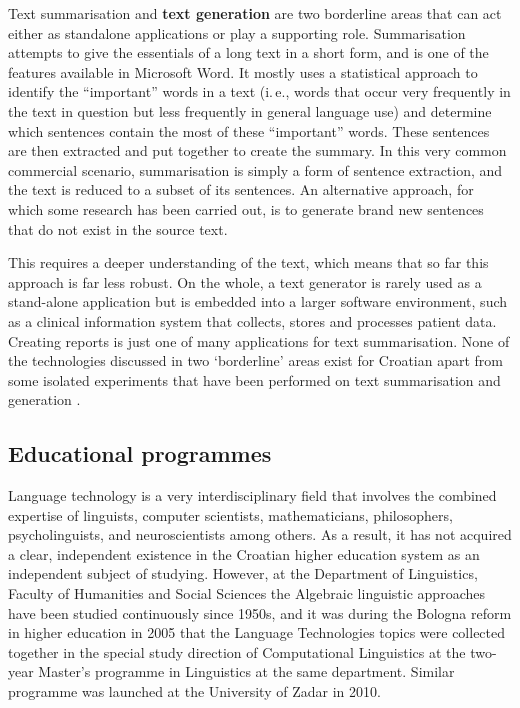 \begin{multicols}{2}
Text summarisation and \textbf{text generation} are two borderline areas that can act either as standalone applications or play a supporting role. Summarisation attempts to give the essentials of a long text in a short form, and is one of the features available in Microsoft Word. It mostly uses a statistical approach to identify the “important” words in a text (i.\,e., words that occur very frequently in the text in question but less frequently in general language use) and determine which sentences contain the most of these “important” words. These sentences are then extracted and put together to create the summary. In this very common commercial scenario, summarisation is simply a form of sentence extraction, and the text is reduced to a subset of its sentences. An alternative approach, for which some research has been carried out, is to generate brand new sentences that do not exist in the source text. 


This requires a deeper understanding of the text, which means that so far this approach is far less robust. On the whole, a text generator is rarely used as a stand-alone application but is embedded into a larger software environment, such as a clinical information system that collects, stores and processes patient data. Creating reports is just one of many applications for text summarisation. None of the technologies discussed in two ‘borderline’ areas exist for Croatian apart from some isolated experiments that have been performed on text summarisation \cite{art5} and generation \cite{art6}. 

\subsection{Educational programmes}

Language technology is a very interdisciplinary field that involves the combined expertise of linguists, computer scientists, mathematicians, philosophers, psycholinguists, and neuroscientists among others. As a result, it has not acquired a clear, independent existence in the Croatian higher education system as an independent subject of studying. However, at the Department of Linguistics, Faculty of Humanities and Social Sciences the Algebraic linguistic approaches have been studied continuously since 1950s, and it was during the Bologna reform in higher education in 2005 that the Language Technologies topics were collected together in the special study direction of Computational Linguistics at the two-year Master’s programme in Linguistics at the same department. Similar programme was launched at the University of Zadar in 2010.


\end{multicols}
